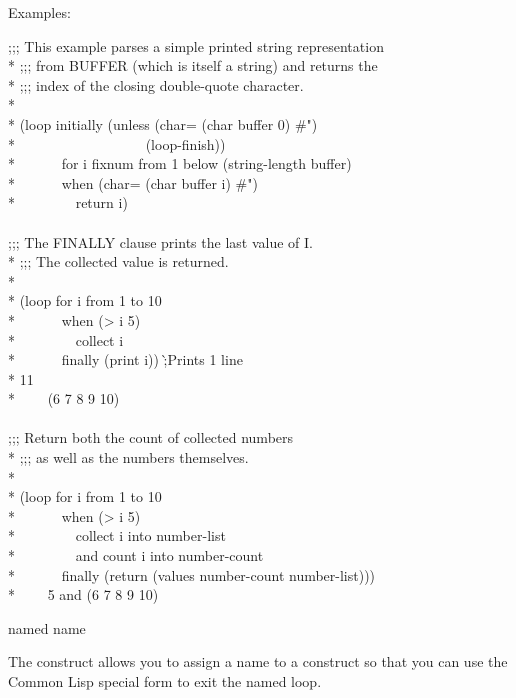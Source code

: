 \begin{new}
\begin{defloop}
Examples:
\begin{lisp}
;;; This example parses a simple printed string representation  \\*
;;; from BUFFER (which is itself a string) and returns the \\*
;;; index of the closing double-quote character. \\*
\\*
(loop initially (unless (char= (char buffer 0) \#{\Xbackslash}") \\*
~~~~~~~~~~~~~~~~~~(loop-finish)) \\*
~~~~~~for i fixnum from 1 below (string-length buffer) \\*
~~~~~~when (char= (char buffer i) \#{\Xbackslash}") \\*
~~~~~~~~return i) \\
 \\
;;; The FINALLY clause prints the last value of I. \\*
;;; The collected value is returned. \\*
\\*
(loop for i from 1 to 10 \\*
~~~~~~when (> i 5) \\*
~~~~~~~~collect i \\*
~~~~~~finally (print i)) \`;{\rm Prints 1 line}\\*
11 \\*
~~~\EV~(6 7 8 9 10) \\
 \\
;;; Return both the count of collected numbers \\*
;;; as well as the numbers themselves. \\*
\\*
(loop for i from 1 to 10 \\*
~~~~~~when (> i 5) \\*
~~~~~~~~collect i into number-list \\*
~~~~~~~~and count i into number-count \\*
~~~~~~finally (return (values number-count number-list))) \\*
~~~\EV~5 {\rm and} (6 7 8 9 10)
\end{lisp}
\end{defloop}

\begin{defloop}
named name

The  construct allows you to assign a name to a 
construct so that you can use the Common Lisp special form 
 to exit the named loop.


\end{defloop}
\end{new}
